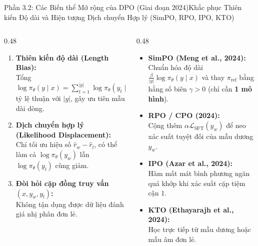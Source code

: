 \begin{frame}{Phần 3.2: Các Biến thể Mở rộng của DPO (Giai đoạn 2024)}{Khắc phục Thiên kiến Độ dài và Hiện tượng Dịch chuyển Hợp lý (SimPO, RPO, IPO, KTO)}
  \begin{columns}[T,onlytextwidth]
    \begin{column}{0.48\textwidth}
      \footnotesize
      \begin{enumerate}\setlength{\itemsep}{5pt}
        \item \textbf{Thiên kiến độ dài (Length Bias):}\\
          Tổng $\log \pi_\theta(y \mid x) = \sum_{t=1}^{|y|} \log \pi_\theta(y_t \mid x, y_{<t})$ tỷ lệ thuận với $|y|$, gây ưu tiên mẫu dài dòng.
        \item \textbf{Dịch chuyển hợp lý (Likelihood Displacement):}\\
          Chỉ tối ưu hiệu số $\hat{r}_w - \hat{r}_l$, có thể làm cả $\log \pi_\theta(y_w)$ lẫn $\log \pi_\theta(y_l)$ cùng giảm.
        \item \textbf{Đòi hỏi cặp đồng truy vấn $(x, y_w, y_l)$:}\\
          Không tận dụng được dữ liệu đánh giá nhị phân đơn lẻ.
      \end{enumerate}
    \end{column}
    \begin{column}{0.48\textwidth}
      \footnotesize
      \begin{itemize}\setlength{\itemsep}{5pt}
        \item \textbf{SimPO (Meng et al., 2024):}\\
          Chuẩn hóa độ dài $\frac{\beta}{|y|}\log \pi_\theta(y \mid x)$ và thay $\pi_{\text{ref}}$ bằng hằng số biên $\gamma > 0$ (chỉ cần \textbf{1 mô hình}).
        \item \textbf{RPO / CPO (2024):}\\
          Cộng thêm $\alpha \mathcal{L}_{\text{SFT}}(y_w)$ để neo xác suất tuyệt đối của mẫu dương $y_w$.
        \item \textbf{IPO (Azar et al., 2024):}\\
          Hàm mất mát bình phương ngăn quá khớp khi xác suất cặp tiệm cận $1$.
        \item \textbf{KTO (Ethayarajh et al., 2024):}\\
          Học trực tiếp từ mẫu dương hoặc mẫu âm đơn lẻ.
      \end{itemize}
    \end{column}
  \end{columns}
\end{frame}

